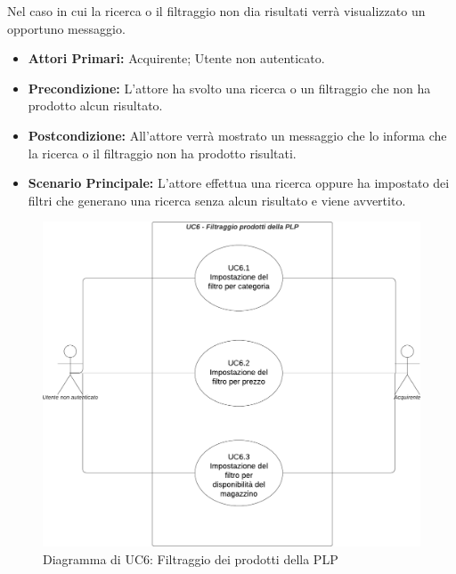 \resetSubUC

Nel caso in cui la ricerca o il filtraggio non dia risultati verrà visualizzato un opportuno messaggio.
\begin{itemize}
    \item \textbf{Attori Primari:} Acquirente; Utente non autenticato. 
    \item \textbf{Precondizione:} L'attore ha svolto una ricerca o un filtraggio che non ha prodotto alcun risultato.
    \item \textbf{Postcondizione:} All'attore verrà mostrato un messaggio che lo informa che la ricerca o il filtraggio non ha prodotto risultati.
    \item \textbf{Scenario Principale:} L'attore effettua una ricerca oppure ha impostato dei filtri che generano una ricerca senza alcun risultato e viene avvertito.
\end{itemize}

\begin{figure}[H]
    \centering
    \includegraphics[scale=0.5]{Immagini/DiagrammiUC/UC6FiltraggioProdottiDellaPLP.png}
    \caption{Diagramma di UC6: Filtraggio dei prodotti della PLP} 
\end{figure}

